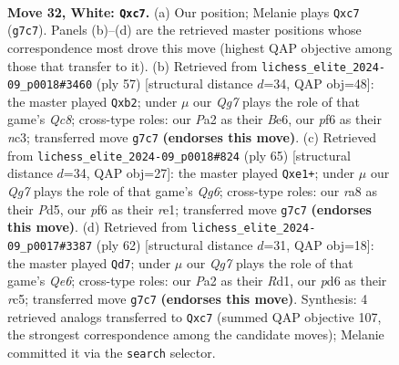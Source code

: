 \documentclass[11pt]{article}
\begin{document}
\clearpage

\begin{figure}[p]\centering
\begin{subfigure}{0.46\textwidth}\centering
\resizebox{\linewidth}{!}{%
\newchessgame
\chessboard[
  setfen={r7/2p3Qp/3pkp2/8/pP6/6P1/P4PKP/1q6 w - - 2 32},
  showmover=false,
  pgfstyle=straightmove, color=movearrow, markmove={g7-c7}
]}
\caption{}
\end{subfigure}\hfill
\begin{subfigure}{0.46\textwidth}\centering
\resizebox{\linewidth}{!}{%
\newchessgame
\chessboard[
  setfen={8/5ppk/Q3b2p/1p6/8/P1N4P/1P3PPK/2q5 b - - 2 29},
  showmover=false,
  pgfstyle=straightmove, color=movearrow, markmove={c1-b2}
]}
\caption{}
\end{subfigure}
\\[4pt]
\begin{subfigure}{0.46\textwidth}\centering
\resizebox{\linewidth}{!}{%
\newchessgame
\chessboard[
  setfen={7k/pp4p1/2p4p/3p4/8/5PqP/PPQ3P1/4R2K b - - 0 33},
  showmover=false,
  pgfstyle=straightmove, color=movearrow, markmove={g3-e1}
]}
\caption{}
\end{subfigure}\hfill
\begin{subfigure}{0.46\textwidth}\centering
\resizebox{\linewidth}{!}{%
\newchessgame
\chessboard[
  setfen={8/1p4pk/4Q2p/2r1p3/8/2P2q2/PP6/1K1R4 w - - 1 32},
  showmover=false,
  pgfstyle=straightmove, color=movearrow, markmove={e6-d7}
]}
\caption{}
\end{subfigure}
\caption{\textbf{Move 32, White: \texttt{Qxc7}.} (a) Our position; Melanie plays \texttt{Qxc7} (\texttt{g7c7}). Panels (b)--(d) are the retrieved master positions whose correspondence most drove this move (highest QAP objective among those that transfer to it). (b) Retrieved from \texttt{lichess\_elite\_2024-09\_p0018\#3460} (ply 57) [structural distance $d$=34, QAP obj=48]: the master played \texttt{Qxb2}; under $\mu$ our \emph{Qg7} plays the role of that game's \emph{Qc8}; cross-type roles: our \emph{P}a2 as their \emph{B}e6, our \emph{p}f6 as their \emph{n}c3; transferred move \texttt{g7c7} \textbf{(endorses this move)}. (c) Retrieved from \texttt{lichess\_elite\_2024-09\_p0018\#824} (ply 65) [structural distance $d$=34, QAP obj=27]: the master played \texttt{Qxe1+}; under $\mu$ our \emph{Qg7} plays the role of that game's \emph{Qg6}; cross-type roles: our \emph{r}a8 as their \emph{P}d5, our \emph{p}f6 as their \emph{r}e1; transferred move \texttt{g7c7} \textbf{(endorses this move)}. (d) Retrieved from \texttt{lichess\_elite\_2024-09\_p0017\#3387} (ply 62) [structural distance $d$=31, QAP obj=18]: the master played \texttt{Qd7}; under $\mu$ our \emph{Qg7} plays the role of that game's \emph{Qe6}; cross-type roles: our \emph{P}a2 as their \emph{R}d1, our \emph{p}d6 as their \emph{r}c5; transferred move \texttt{g7c7} \textbf{(endorses this move)}. Synthesis: 4 retrieved analogs transferred to \texttt{Qxc7} (summed QAP objective 107, the strongest correspondence among the candidate moves); Melanie committed it via the \texttt{search} selector.}
\label{fig:thought-m62}
\end{figure}
\end{document}
